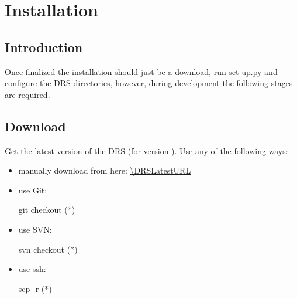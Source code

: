 \chapter{Installation}
\label{chapter:installation}


\section{Introduction}
\label{ch:install:installintro}

Once finalized the installation should just be a download, run set-up.py and configure the DRS directories, however, during development the following stages are required.








\section{Download}
\label{ch:install:installDownload}

Get the latest version of the DRS (for \instrument version \MyCodeVersion). Use any of the following ways:

\begin{itemize}
\item manually download from here: \url{\DRSLatestURL}

\item use Git:
\begin{cmdbox}
git checkout (*\DRSGitURL*)
\end{cmdbox}

\item use SVN:
\begin{cmdbox}
svn checkout  (*\DRSGitURL*)
\end{cmdbox}

\item use ssh:
\begin{cmdbox}
scp -r (*\DRSsshURL*)
\end{cmdbox}

\end{itemize}


